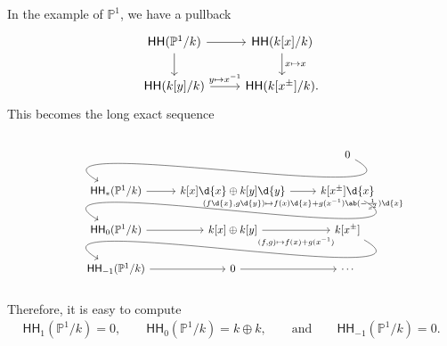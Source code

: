 \documentclass[10pt, oneside]{memoir}
\theoremstyle{definition}
\theoremstyle{remark}
\theoremstyle{plain}
\theoremstyle{definition}
\theoremstyle{remark}
\renewcommand{\P}{\mathbb{P}}
\newcommand{\ms}[1]{\mathsf{#1}}
\newcommand{\1}{\mathbf{1}}
\newcommand{\2}{\mathbf{2}}
\newcommand{\3}{\mathbf{3}}
\newcommand{\HH}{\ms{HH}}
\begin{document}
In the example of $\P^1$, we have a pullback
\begin{equation*}
\begin{tikzcd}
    \HH(\P^1/k) \ar{r} \ar{d} & \HH(k[x]/k) \ar{d}{x \mapsto x} \\
    \HH(k[y]/k) \ar{r}{y \mapsto x^{-1}} & \HH(k[x^{\pm}]/k).
\end{tikzcd}
\end{equation*}
This becomes the long exact sequence
\begin{equation*}
    \begin{tikzcd}
        & & 0 \ar[out=-30,in=150]{dll} \\
        \HH_*(\P^1/k) \rar & k[x]\d{x} \oplus k[y] \d{y} \arrow[swap, r, "{(f \d{x}, g \d{y}) \mapsto f(x)\d{x} + g(x^{-1})\ab(-\frac{1}{x^2}) \d{x}}" {yshift=-1ex}] & k[x^{\pm}] \d{x} \ar[out=-30,in=150]{dll} \\
        \HH_{0}(\P^1/k) \ar{r} & k[x] \oplus k[y] \arrow[swap, r, "{(f,g) \mapsto f(x)+g(x^{-1})}" {yshift=-1ex}] & k[x^{\pm}]\arrow[out=-30,in=150]{dll} \\
        \HH_{-1}(\P^1/k) \ar{r} & 0 \ar{r} & \cdots
    \end{tikzcd}
\end{equation*}
Therefore, it is easy to compute
\begin{align*}
    \HH_1(\P^1/k) = 0, \qquad \HH_0(\P^1/k) = k \oplus k, \qquad \text{and} \qquad \HH_{-1}(\P^1/k) = 0.
\end{align*}
\end{document}
